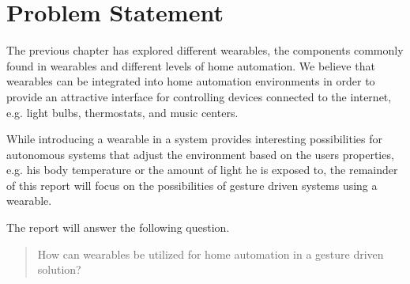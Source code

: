 \section{Problem Statement}\label{sec:researchstatement}

The previous chapter has explored different wearables, the components commonly found in wearables and different levels of home automation. We believe that wearables can be integrated into home automation environments in order to provide an attractive interface for controlling devices connected to the internet, e.g. light bulbs, thermostats, and music centers.

While introducing a wearable in a system provides interesting possibilities for autonomous systems that adjust the environment based on the users properties, e.g. his body temperature or the amount of light he is exposed to, the remainder of this report will focus on the possibilities of gesture driven systems using a wearable.

The report will answer the following question.

\begin{framed}
    \begin{quote}
        
      How can wearables be utilized for home automation in a gesture driven solution?
    \end{quote}
\end{framed}


